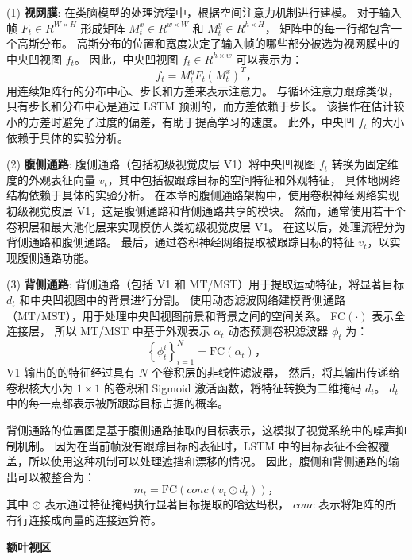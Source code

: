 \documentclass[a4paper,zihao=-4]{article}
\begin{document}
(1) \textbf{视网膜}: 
在类脑模型的处理流程中，根据空间注意力机制进行建模。
对于输入帧 $F_t \in R^{W \times H}$ 形成矩阵 $M_t^x \in R^{w \times W}$ 和 $M_t^y \in R^{h \times H}$，
矩阵中的每一行都包含一个高斯分布。
高斯分布的位置和宽度决定了输入帧的哪些部分被选为视网膜中的中央凹视图 $f_t$。
因此，中央凹视图 $f_t \in R^{h \times w}$ 可以表示为：
\begin{equation}
	f_t = M_t^y F_t (M_t^x)^T \mbox{，}
\end{equation}
用连续矩阵行的分布中心、步长和方差来表示注意力。
与循环注意力跟踪类似，只有步长和分布中心是通过 LSTM 预测的，而方差依赖于步长。
该操作在估计较小的方差时避免了过度的偏差，有助于提高学习的速度。
此外，中央凹 $f_t$ 的大小依赖于具体的实验分析。

(2) \textbf{腹侧通路}: 
腹侧通路（包括初级视觉皮层 V1）将中央凹视图 $f_t$ 转换为固定维度的外观表征向量 $v_t$，其中包括被跟踪目标的空间特征和外观特征，
具体地网络结构依赖于具体的实验分析。
在本章的腹侧通路架构中，使用卷积神经网络实现初级视觉皮层 V1，这是腹侧通路和背侧通路共享的模块。
然而，通常使用若干个卷积层和最大池化层来实现模仿人类初级视觉皮层 V1。
在这以后，处理流程分为背侧通路和腹侧通路。
最后，通过卷积神经网络提取被跟踪目标的特征 $v_t$，以实现腹侧通路功能。

(3) \textbf{背侧通路}: 
背侧通路（包括 V1 和 MT/MST）用于提取运动特征，将显著目标 $d_t$ 和中央凹视图中的背景进行分割。
使用动态滤波网络建模背侧通路（MT/MST），用于处理中央凹视图前景和背景之间的空间关系。
FC$(\cdot)$ 表示全连接层，
所以 MT/MST 中基于外观表示 $\alpha_t$ 动态预测卷积滤波器 $\phi_t$ 为：
\begin{equation}
	\left\{ \phi _t ^i \right\}_{i=1}^N = \text{FC}(\alpha_t) \mbox{，}
\end{equation}
V1 输出的的特征经过具有 $N$ 个卷积层的非线性滤波器，
然后，将其输出传递给卷积核大小为 $1 \times 1$ 的卷积和 Sigmoid 激活函数，将特征转换为二维掩码 $d_t$。
$d_t$ 中的每一点都表示被所跟踪目标占据的概率。

背侧通路的位置图是基于腹侧通路抽取的目标表示，这模拟了视觉系统中的噪声抑制机制。
因为在当前帧没有跟踪目标的表征时，LSTM 中的目标表征不会被覆盖，所以使用这种机制可以处理遮挡和漂移的情况。
因此，腹侧和背侧通路的输出可以被整合为：
\begin{equation}
	m_t = \text{FC}(conc(v_t \odot d_t)) \mbox{，}
\end{equation}
其中 $\odot$ 表示通过特征掩码执行显著目标提取的哈达玛积，
$conc$ 表示将矩阵的所有行连接成向量的连接运算符。

\textbf{额叶视区}
\end{document}
